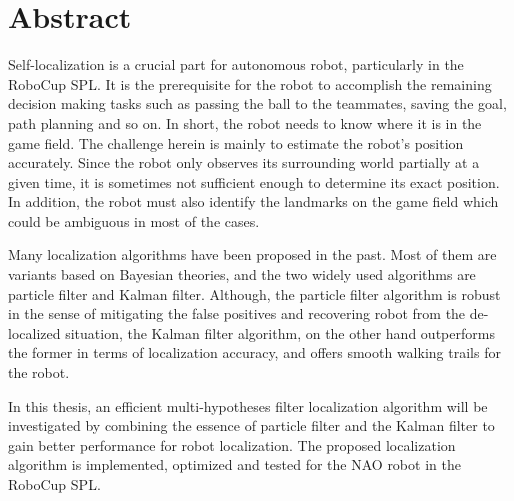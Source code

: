 \thispagestyle{empty}
\chapter*{Abstract}

Self-localization is a crucial part for autonomous robot, particularly in the RoboCup \gls{SPL}. It is the prerequisite for the robot to accomplish the remaining decision making tasks such as passing the ball to the teammates, saving the goal, path planning and so on. In short, the robot needs to know where it is in the game field. The challenge herein is mainly to estimate the robot's position accurately. Since the robot only observes its surrounding world partially at a given time, it is sometimes not sufficient enough to determine its exact position. In addition, the robot must also identify the landmarks on the game field which could be ambiguous in most of the cases. 


Many localization algorithms have been proposed in the past. Most of them are variants based on Bayesian theories, and the two widely used algorithms are particle filter and Kalman filter. Although, the particle filter algorithm is robust in the sense of mitigating the false positives and recovering robot from the de-localized situation,
the Kalman filter algorithm, on the other hand outperforms 
the former in terms of localization accuracy, and offers smooth walking trails 
for the robot. 

In this thesis, an efficient multi-hypotheses filter localization algorithm will be 
investigated by combining the essence of particle filter and the Kalman filter to gain better performance for robot localization. The proposed localization algorithm is implemented, optimized and tested for the NAO robot in the RoboCup \gls{SPL}.
